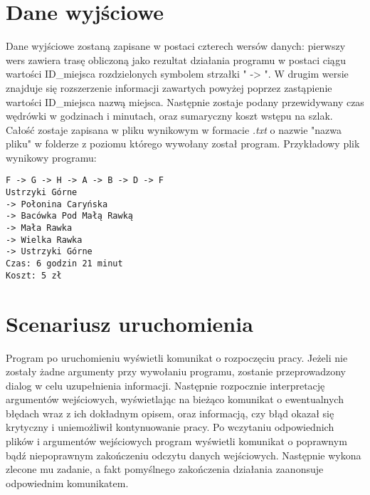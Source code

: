 \documentclass{article}
\begin{document}
\section{Dane wyjściowe}
Dane wyjściowe zostaną zapisane w postaci czterech wersów danych: pierwszy wers zawiera trasę obliczoną jako rezultat działania programu w postaci ciągu wartości ID\_miejsca rozdzielonych symbolem strzałki " -> ". W drugim wersie znajduje się rozszerzenie informacji zawartych powyżej poprzez zastąpienie wartości ID\_miejsca nazwą miejsca. Następnie zostaje podany przewidywany czas wędrówki w godzinach i minutach, oraz sumaryczny koszt wstępu na szlak. Całość zostaje zapisana w pliku wynikowym w formacie \textit{.txt} o nazwie "nazwa pliku" w folderze z poziomu którego wywołany został program. 
\newline
Przykładowy plik wynikowy programu:
\begin{verbatim}
F -> G -> H -> A -> B -> D -> F
Ustrzyki Górne 
-> Połonina Caryńska 
-> Bacówka Pod Małą Rawką 
-> Mała Rawka 
-> Wielka Rawka 
-> Ustrzyki Górne
Czas: 6 godzin 21 minut
Koszt: 5 zł
\end{verbatim}
\section{Scenariusz uruchomienia}
Program po uruchomieniu wyświetli komunikat o rozpoczęciu pracy. Jeżeli nie zostały żadne argumenty przy wywołaniu programu, zostanie przeprowadzony dialog w celu uzupełnienia informacji. Następnie rozpocznie interpretację argumentów wejściowych, wyświetlając na bieżąco komunikat o ewentualnych błędach wraz z ich dokładnym opisem, oraz informacją, czy błąd okazał się krytyczny i uniemożliwił kontynuowanie pracy. Po wczytaniu odpowiednich plików i argumentów wejściowych program wyświetli komunikat o poprawnym bądź niepoprawnym zakończeniu odczytu danych wejściowych. Następnie wykona zlecone mu zadanie, a fakt pomyślnego zakończenia działania zaanonsuje odpowiednim komunikatem.
\end{document}
